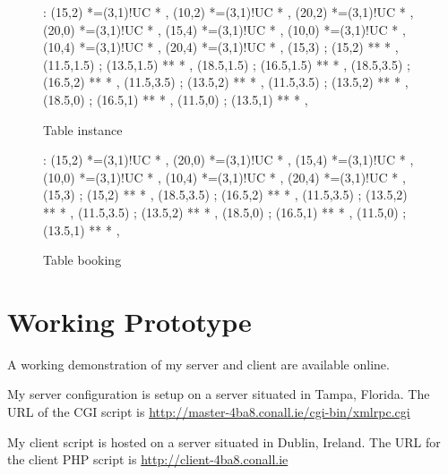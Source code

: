 \documentclass[a4paper,10pt]{article}
\newcommand{\primarykey}[1]{\mbox{{\color{NavyBlue}{$#1$}}}}
\newcommand{\foreignkey}[1]{{\mbox{\color{Emerald}{$#1$}}}}
\begin{document}
\begin{figure}[ht]

\xy<1cm,0cm>:
(15,2) *=(3,1)!UC\txt{\primarykey{UniqueID}} *\frm{-} ,
(10,2) *=(3,1)!UC *\frm{-} ,
(20,2) *=(3,1)!UC *\frm{-} ,
(20,0) *=(3,1)!UC *\frm{-} ,
(15,4) *=(3,1)!UC\txt{\foreignkey{ServiceID}} *\frm{-} ,
(10,0) *=(3,1)!UC *\frm{-} ,
(10,4) *=(3,1)!UC *\frm{-} ,
(20,4) *=(3,1)!UC *\frm{-} ,
(15,3) ; (15,2) **\dir{-}  *\dir{>} ,
(11.5,1.5) ; (13.5,1.5) **\dir{-}  *\dir{>} ,
(18.5,1.5) ; (16.5,1.5) **\dir{-}  *\dir{>} ,
(18.5,3.5) ; (16.5,2) **\dir{-}  *\dir{>} ,
(11.5,3.5) ; (13.5,2) **\dir{-}  *\dir{>} ,
(11.5,3.5) ; (13.5,2) **\dir{-}  *\dir{>} ,
(18.5,0) ; (16.5,1) **\dir{-}  *\dir{>} ,
(11.5,0) ; (13.5,1) **\dir{-}  *\dir{>} ,
\endxy

\caption{Table instance}

\end{figure}

\begin{figure}[ht]

\xy<1cm,0cm>:
(15,2) *=(3,1)!UC\txt{\primarykey{BookingID}} *\frm{-} ,
(20,0) *=(3,1)!UC *\frm{-} ,
(15,4) *=(3,1)!UC\txt{\foreignkey{UniqueID}} *\frm{-} ,
(10,0) *=(3,1)!UC *\frm{-} ,
(10,4) *=(3,1)!UC *\frm{-} ,
(20,4) *=(3,1)!UC *\frm{-} ,
(15,3) ; (15,2) **\dir{-}  *\dir{>} ,
(18.5,3.5) ; (16.5,2) **\dir{-}  *\dir{>} ,
(11.5,3.5) ; (13.5,2) **\dir{-}  *\dir{>} ,
(11.5,3.5) ; (13.5,2) **\dir{-}  *\dir{>} ,
(18.5,0) ; (16.5,1) **\dir{-}  *\dir{>} ,
(11.5,0) ; (13.5,1) **\dir{-}  *\dir{>} ,
\endxy

\caption{Table booking}

\end{figure}


\section{Working Prototype}

A working demonstration of my server and client are available online.


My server configuration is setup on a server situated in Tampa, Florida.
The URL of the CGI script is
\url{http://master-4ba8.conall.ie/cgi-bin/xmlrpc.cgi}


My client script is hosted on a server situated in Dublin, Ireland. The
URL for the client PHP script is
\url{http://client-4ba8.conall.ie}
\end{document}
